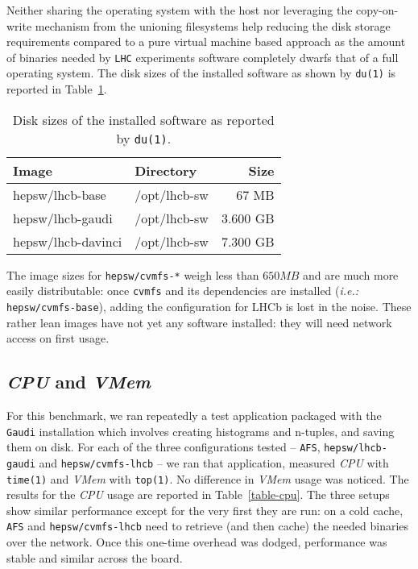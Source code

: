 \documentclass[a4paper]{jpconf}
\begin{document}
Neither sharing the operating system with the host nor leveraging the
copy-on-write mechanism from the unioning filesystems help reducing the disk
storage requirements compared to a pure virtual machine based approach as the
amount of binaries needed by \texttt{LHC} experiments software completely dwarfs
that of a full operating system.
The disk sizes of the installed software as shown by \texttt{du(1)} is reported
in Table~\ref{table-du}.

\begin{table}[h]
	\begin{center}
		\begin{tabular}{l | l | r}
			Image & Directory & Size \\
			\hline
			hepsw/lhcb-base    & /opt/lhcb-sw &   67 MB  \\
			hepsw/lhcb-gaudi   & /opt/lhcb-sw & 3.600 GB \\
			hepsw/lhcb-davinci & /opt/lhcb-sw & 7.300 GB \\
			\hline
		\end{tabular}
	\end{center}
	\caption{\label{table-du}Disk sizes of the installed software as reported by
	\texttt{du(1)}.}
\end{table}

The image sizes for \texttt{hepsw/cvmfs-*} weigh less than $650 MB$ and are much
more easily distributable: once \texttt{cvmfs} and its dependencies are
installed (\emph{i.e.:} \texttt{hepsw/cvmfs-base}), adding the configuration for
LHCb is lost in the noise.
These rather lean images have not yet any software installed: they will need
network access on first usage.

\subsection{\emph{CPU} and \emph{VMem}}
For this benchmark, we ran repeatedly a test application packaged with the
\texttt{Gaudi} installation which involves creating histograms and n-tuples, and
saving them on disk.
For each of the three configurations tested -- \texttt{AFS},
\texttt{hepsw/lhcb-gaudi} and \texttt{hepsw/cvmfs-lhcb} -- we ran that
application, measured \emph{CPU} with \texttt{time(1)} and \emph{VMem} with
\texttt{top(1)}.
No difference in \emph{VMem} usage was noticed.
The results for the \emph{CPU} usage are reported in Table~\ref{table-cpu}.
The three setups show similar performance except for the very first they are
run: on a cold cache, \texttt{AFS} and \texttt{hepsw/cvmfs-lhcb} need to
retrieve (and then cache) the needed binaries over the network.
Once this one-time overhead was dodged, performance was stable and similar
across the board.
\end{document}
